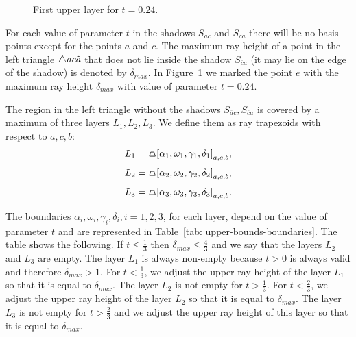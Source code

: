 \begin{figure}
\begin{center}

\end{center}
\caption{First upper layer for $t = 0.24.$}
\label{fig: upper-layers}
\end{figure}

For each value of parameter $t$ in the shadows $S_{\overline{a}c}$ and $S_{\overline{c}a}$ there will be no basis points except for the points $a$ and $c$. The maximum ray height of a point in the left triangle $\triangle{ac\tilde{a}}$ that does not lie inside the shadow $S_{\overline{c}a}$ (it may lie on the edge of the shadow) is denoted by $\delta_{max}$. In Figure~\ref{fig: upper-layers} we marked the point $e$ with the maximum ray height $\delta_{max}$ with value of parameter $t = 0.24$.

The region in the left triangle without the shadows $S_{\overline{a}c}, S_{\overline{c}a}$ is covered by a maximum of three layers $L_{1},L_{2},L_{3}$. We define them as ray trapezoids with respect to $a, c, b$:
$$
L_{1} = \tpz{\left[ \alpha_{1},\omega_{1},\gamma_{1},\delta_{1} \right]_{a,c,b} },
$$
$$
L_{2} = \tpz{\left[ \alpha_{2},\omega_{2},\gamma_{2},\delta_{2} \right]_{a,c,b} },
$$
$$
L_{3} = \tpz{\left[ \alpha_{3},\omega_{3},\gamma_{3},\delta_{3} \right]_{a,c,b} }.
$$

The boundaries $\alpha_{i},\omega_{i},\gamma_{i},\delta_{i}, i = 1,2,3$, for each layer, depend on the value of parameter $t$ and are represented in Table~\ref{tab: upper-bounds-boundaries}. The table shows the following. If $t \leq \frac{1}{3}$ then $\delta_{max} \leq \frac{4}{3}$ and we say that the layers $L_{2}$ and $L_{3}$ are empty. The layer $L_{1}$ is always non-empty because $t > 0$ is always valid and therefore $\delta_{max} > 1$. For $t < \frac{1}{3}$, we adjust the upper ray height of the layer $L_{1}$ so that it is equal to $\delta_{max}$. The layer $L_{2}$ is not empty for $t > \frac{1}{3}$. For $t < \frac{2}{3}$, we adjust the upper ray height of the layer $L_{2}$ so that it is equal to $\delta_{max}$. The layer $L_{3}$ is not empty for $t > \frac{2}{3}$ and we adjust the upper ray height of this layer so that it is equal to $\delta_{max}$.

